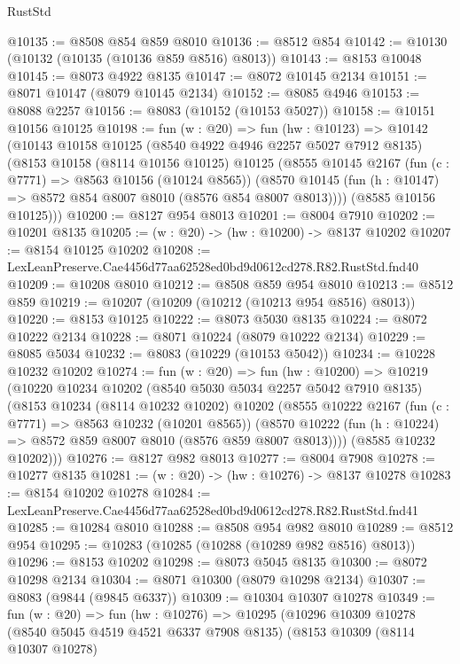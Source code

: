 \begin{lexlean}{RustStd}
\begin{coremodule}
@10135 := @8508 @854 @859 @8010
@10136 := @8512 @854
@10142 := @10130 (@10132 (@10135 (@10136 @859 @8516) @8013))
@10143 := @8153 @10048
@10145 := @8073 @4922 @8135
@10147 := @8072 @10145 @2134
@10151 := @8071 @10147 (@8079 @10145 @2134)
@10152 := @8085 @4946
@10153 := @8088 @2257
@10156 := @8083 (@10152 (@10153 @5027))
@10158 := @10151 @10156 @10125
@10198 := fun (w : @20) =>
  fun (hw : @10123) =>
  @10142
    (@10143
      @10158
      @10125
      (@8540 @4922 @4946 @2257 @5027 @7912 @8135)
      (@8153
        @10158
        (@8114 @10156 @10125)
        @10125
        (@8555
          @10145
          @2167
          (fun (c : @7771) => @8563 @10156 (@10124 @8565))
          (@8570 @10145 (fun (h : @10147) => @8572 @854 @8007 @8010 (@8576 @854 @8007 @8013))))
        (@8585 @10156 @10125)))
@10200 := @8127 @954 @8013
@10201 := @8004 @7910
@10202 := @10201 @8135
@10205 := (w : @20) -> (hw : @10200) -> @8137 @10202
@10207 := @8154 @10125 @10202
@10208 := LexLeanPreserve.Cae4456d77aa62528ed0bd9d0612cd278.R82.RustStd.fnd40
@10209 := @10208 @8010
@10212 := @8508 @859 @954 @8010
@10213 := @8512 @859
@10219 := @10207 (@10209 (@10212 (@10213 @954 @8516) @8013))
@10220 := @8153 @10125
@10222 := @8073 @5030 @8135
@10224 := @8072 @10222 @2134
@10228 := @8071 @10224 (@8079 @10222 @2134)
@10229 := @8085 @5034
@10232 := @8083 (@10229 (@10153 @5042))
@10234 := @10228 @10232 @10202
@10274 := fun (w : @20) =>
  fun (hw : @10200) =>
  @10219
    (@10220
      @10234
      @10202
      (@8540 @5030 @5034 @2257 @5042 @7910 @8135)
      (@8153
        @10234
        (@8114 @10232 @10202)
        @10202
        (@8555
          @10222
          @2167
          (fun (c : @7771) => @8563 @10232 (@10201 @8565))
          (@8570 @10222 (fun (h : @10224) => @8572 @859 @8007 @8010 (@8576 @859 @8007 @8013))))
        (@8585 @10232 @10202)))
@10276 := @8127 @982 @8013
@10277 := @8004 @7908
@10278 := @10277 @8135
@10281 := (w : @20) -> (hw : @10276) -> @8137 @10278
@10283 := @8154 @10202 @10278
@10284 := LexLeanPreserve.Cae4456d77aa62528ed0bd9d0612cd278.R82.RustStd.fnd41
@10285 := @10284 @8010
@10288 := @8508 @954 @982 @8010
@10289 := @8512 @954
@10295 := @10283 (@10285 (@10288 (@10289 @982 @8516) @8013))
@10296 := @8153 @10202
@10298 := @8073 @5045 @8135
@10300 := @8072 @10298 @2134
@10304 := @8071 @10300 (@8079 @10298 @2134)
@10307 := @8083 (@9844 (@9845 @6337))
@10309 := @10304 @10307 @10278
@10349 := fun (w : @20) =>
  fun (hw : @10276) =>
  @10295
    (@10296
      @10309
      @10278
      (@8540 @5045 @4519 @4521 @6337 @7908 @8135)
      (@8153
        @10309
        (@8114 @10307 @10278)

\end{coremodule}
\end{lexlean}
